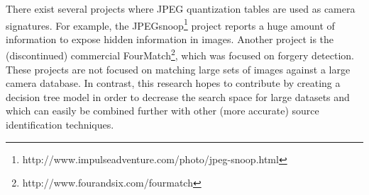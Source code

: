 There exist several projects where JPEG quantization tables are used as camera signatures. For example, the JPEGsnoop\footnote{http://www.impulseadventure.com/photo/jpeg-snoop.html} project reports a huge amount of information to expose hidden information in images. Another project is the (discontinued) commercial FourMatch\footnote{http://www.fourandsix.com/fourmatch}, which was focused on forgery detection. These projects are not focused on matching large sets of images against a large camera database. In contrast, this research hopes to contribute by creating a decision tree model in order to decrease the search space for large datasets and which can easily be combined further with other (more accurate) source identification techniques. 